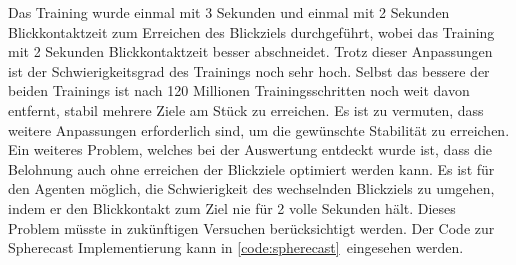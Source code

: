 Das Training wurde einmal mit 3 Sekunden und einmal mit 2 Sekunden Blickkontaktzeit zum Erreichen des Blickziels durchgeführt, wobei das Training mit 2 Sekunden Blickkontaktzeit besser abschneidet. Trotz dieser Anpassungen ist der Schwierigkeitsgrad des Trainings noch sehr hoch. Selbst das bessere der beiden Trainings ist nach 120 Millionen Trainingsschritten noch weit davon entfernt, stabil mehrere Ziele am Stück zu erreichen. Es ist zu vermuten, dass weitere Anpassungen erforderlich sind, um die gewünschte Stabilität zu erreichen. Ein weiteres Problem, welches bei der Auswertung entdeckt wurde ist, dass die Belohnung auch ohne erreichen der Blickziele optimiert werden kann. Es ist für den Agenten möglich, die Schwierigkeit des wechselnden Blickziels zu umgehen, indem er den Blickkontakt zum Ziel nie für 2 volle Sekunden hält. Dieses Problem müsste in zukünftigen Versuchen berücksichtigt werden. Der Code zur Spherecast Implementierung kann in \ref{code:spherecast} eingesehen werden.

